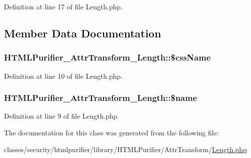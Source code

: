 Definition at line 17 of file Length.\+php.



\subsection{Member Data Documentation}
\hypertarget{classHTMLPurifier__AttrTransform__Length_acf4647e011cfb76591ee8bdbf8827d96}{
\subsubsection[{\$css\+Name}]{\setlength{\rightskip}{0pt plus 5cm}H\+T\+M\+L\+Purifier\+\_\+\+Attr\+Transform\+\_\+\+Length\+::\$css\+Name\hspace{0.3cm}{\ttfamily [protected]}}}\label{classHTMLPurifier__AttrTransform__Length_acf4647e011cfb76591ee8bdbf8827d96}


Definition at line 10 of file Length.\+php.

\hypertarget{classHTMLPurifier__AttrTransform__Length_abd9ec3d6894fadd50a4955376bb409f5}{
\subsubsection[{\$name}]{\setlength{\rightskip}{0pt plus 5cm}H\+T\+M\+L\+Purifier\+\_\+\+Attr\+Transform\+\_\+\+Length\+::\$name\hspace{0.3cm}{\ttfamily [protected]}}}\label{classHTMLPurifier__AttrTransform__Length_abd9ec3d6894fadd50a4955376bb409f5}


Definition at line 9 of file Length.\+php.



The documentation for this class was generated from the following file\+:\begin{DoxyCompactItemize}
\item 
classes/security/htmlpurifier/library/\+H\+T\+M\+L\+Purifier/\+Attr\+Transform/\hyperlink{AttrTransform_2Length_8php}{Length.\+php}\end{DoxyCompactItemize}
